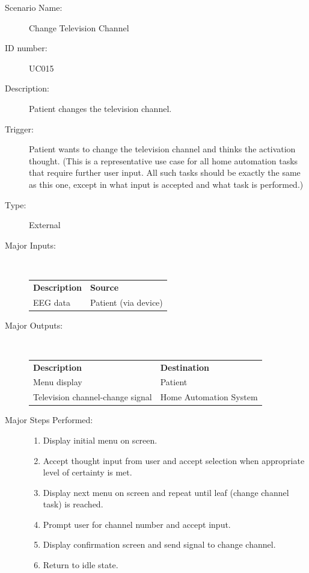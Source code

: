 \documentclass{article}
\begin{document}
\begin{description}
    \item[Scenario Name:] Change Television Channel
    \item[ID number:] UC015
    \item[Description:] Patient changes the television channel.
    \item[Trigger:] Patient wants to change the television channel and thinks
        the activation thought. (This is a representative use case for all
        home automation tasks that require further user input. All such tasks
        should be exactly the same as this one, except in what input is
        accepted and what task is performed.)
    \item[Type:] External
    \item[Major Inputs:] \hfill \\
        \begin{tabular}{l l}
            \textbf{Description} & \textbf{Source} \\
            EEG data & Patient (via device) \\
        \end{tabular}
    \item[Major Outputs:] \hfill \\
        \begin{tabular}{l l}
            \textbf{Description} & \textbf{Destination} \\
            Menu display & Patient \\
            Television channel-change signal & Home Automation System
        \end{tabular}
    \item[Major Steps Performed:] \hfill
        \begin{enumerate}
            \item Display initial menu on screen.
            \item Accept thought input from user and accept selection when
                appropriate level of certainty is met.
            \item Display next menu on screen and repeat until leaf (change
                channel task) is reached.
            \item Prompt user for channel number and accept input.
            \item Display confirmation screen and send signal to change
                channel.
            \item Return to idle state.
        \end{enumerate}
\end{description}
\end{document}
